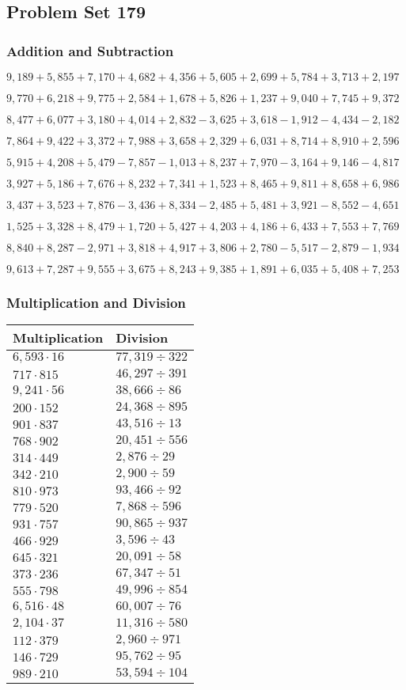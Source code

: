 \hypertarget{problem-set-179}{%
\subsection{Problem Set 179}\label{problem-set-179}}

\hypertarget{addition-and-subtraction}{%
\subsubsection{Addition and
Subtraction}\label{addition-and-subtraction}}

\(9,189+5,855+7,170+4,682+4,356+5,605+2,699+5,784+3,713+2,197\)

\(9,770+6,218+9,775+2,584+1,678+5,826+1,237+9,040+7,745+9,372\)

\(8,477+6,077+3,180+4,014+2,832-3,625+3,618-1,912-4,434-2,182\)

\(7,864+9,422+3,372+7,988+3,658+2,329+6,031+8,714+8,910+2,596\)

\(5,915+4,208+5,479-7,857-1,013+8,237+7,970-3,164+9,146-4,817\)

\(3,927+5,186+7,676+8,232+7,341+1,523+8,465+9,811+8,658+6,986\)

\(3,437+3,523+7,876-3,436+8,334-2,485+5,481+3,921-8,552-4,651\)

\(1,525+3,328+8,479+1,720+5,427+4,203+4,186+6,433+7,553+7,769\)

\(8,840+8,287-2,971+3,818+4,917+3,806+2,780-5,517-2,879-1,934\)

\(9,613+7,287+9,555+3,675+8,243+9,385+1,891+6,035+5,408+7,253\)

\hypertarget{multiplication-and-division}{%
\subsubsection{Multiplication and
Division}\label{multiplication-and-division}}

\begin{longtable}[]{@{}ll@{}}
\toprule
Multiplication & Division\tabularnewline
\midrule
\endhead
\(6,593\cdot16\) & \(77,319÷322\)\tabularnewline
\(717\cdot815\) & \(46,297÷391\)\tabularnewline
\(9,241\cdot56\) & \(38,666÷86\)\tabularnewline
\(200\cdot152\) & \(24,368÷895\)\tabularnewline
\(901\cdot837\) & \(43,516÷13\)\tabularnewline
\(768\cdot902\) & \(20,451÷556\)\tabularnewline
\(314\cdot449\) & \(2,876÷29\)\tabularnewline
\(342\cdot210\) & \(2,900÷59\)\tabularnewline
\(810\cdot973\) & \(93,466÷92\)\tabularnewline
\(779\cdot520\) & \(7,868÷596\)\tabularnewline
\(931\cdot757\) & \(90,865÷937\)\tabularnewline
\(466\cdot929\) & \(3,596÷43\)\tabularnewline
\(645\cdot321\) & \(20,091÷58\)\tabularnewline
\(373\cdot236\) & \(67,347÷51\)\tabularnewline
\(555\cdot798\) & \(49,996÷854\)\tabularnewline
\(6,516\cdot48\) & \(60,007÷76\)\tabularnewline
\(2,104\cdot37\) & \(11,316÷580\)\tabularnewline
\(112\cdot379\) & \(2,960÷971\)\tabularnewline
\(146\cdot729\) & \(95,762÷95\)\tabularnewline
\(989\cdot210\) & \(53,594÷104\)\tabularnewline
\bottomrule
\end{longtable}
